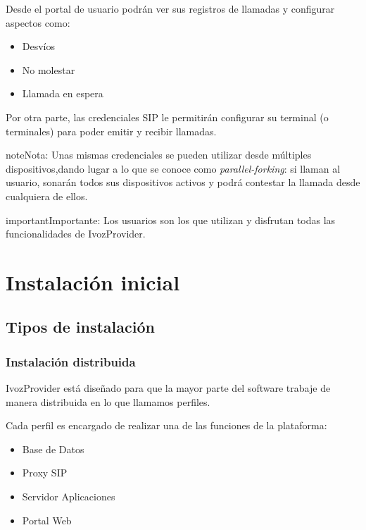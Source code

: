 \documentclass[letterpaper,10pt,spanish]{sphinxmanual}
\begin{document}
Desde el portal de usuario podrán ver sus registros de llamadas y configurar aspectos como:
\begin{itemize}
\item {} 
Desvíos

\item {} 
No molestar

\item {} 
Llamada en espera

\end{itemize}

Por otra parte, las credenciales SIP le permitirán configurar su terminal (o terminales) para poder emitir y recibir llamadas.

\begin{notice}{note}{Nota:}
Unas mismas credenciales se pueden utilizar desde múltiples dispositivos,dando lugar a lo que se conoce como \emph{parallel-forking}: si llaman al usuario, sonarán todos sus dispositivos activos y podrá contestar la llamada desde cualquiera de ellos.
\end{notice}

\begin{notice}{important}{Importante:}
Los usuarios son los que utilizan y disfrutan todas las funcionalidades de IvozProvider.
\end{notice}


\chapter{Instalación inicial}
\label{installation/index::doc}\label{installation/index:initial-installation}

\section{Tipos de instalación}
\label{installation/install_types::doc}\label{installation/install_types:installation-types}

\subsection{Instalación distribuida}
\label{installation/install_types:distributed-install}
IvozProvider está diseñado para que la mayor parte del software trabaje de manera distribuida en lo que llamamos perfiles.

Cada perfil es encargado de realizar una de las funciones de la plataforma:
\begin{itemize}
\item {} 
Base de Datos

\item {} 
Proxy SIP

\item {} 
Servidor Aplicaciones

\item {} 
Portal Web

\end{itemize}
\end{document}
